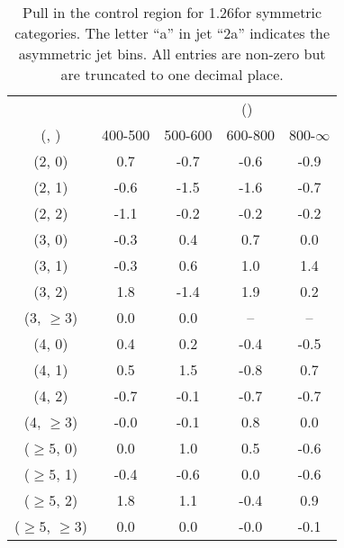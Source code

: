 \begin{table}[h!]
\tiny
\centering
\caption{Pull in the \gj control region for 1.26\ifb for symmetric categories. The letter ``a'' in jet \eg ``2a''  indicates the asymmetric jet bins. All entries are non-zero but are truncated to one decimal place.\label{tab:pullsep_ewk_gj_sym}}
\begin{tabular}
{ccccc}
	\hline\hline
&	& \multicolumn{4}{c}{\scalht (\gev)} \\ 
	 (\njet,  \nb) & 400-500 & 500-600 & 600-800 & 800-$\infty$ \\ [0.8ex] 
\hline
	(2, 0) & 0.7 & -0.7 & -0.6 & -0.9 \\[0.5ex] 
	(2, 1) & -0.6 & -1.5 & -1.6 & -0.7 \\[0.5ex] 
	(2, 2) & -1.1 & -0.2 & -0.2 & -0.2 \\[0.5ex] 
	(3, 0) & -0.3 & 0.4 & 0.7 & 0.0 \\[0.5ex] 
	(3, 1) & -0.3 & 0.6 & 1.0 & 1.4 \\[0.5ex] 
	(3, 2) & 1.8 & -1.4 & 1.9 & 0.2 \\[0.5ex] 
	(3, $\ge3$) & 0.0 & 0.0 & -- & -- \\[0.5ex] 
	(4, 0) & 0.4 & 0.2 & -0.4 & -0.5 \\[0.5ex] 
	(4, 1) & 0.5 & 1.5 & -0.8 & 0.7 \\[0.5ex] 
	(4, 2) & -0.7 & -0.1 & -0.7 & -0.7 \\[0.5ex] 
	(4, $\ge3$) & -0.0 & -0.1 & 0.8 & 0.0 \\[0.5ex] 
	($\ge5$, 0) & 0.0 & 1.0 & 0.5 & -0.6 \\[0.5ex] 
	($\ge5$, 1) & -0.4 & -0.6 & 0.0 & -0.6 \\[0.5ex] 
	($\ge5$, 2) & 1.8 & 1.1 & -0.4 & 0.9 \\[0.5ex] 
	($\ge5$, $\ge3$) & 0.0 & 0.0 & -0.0 & -0.1 \\[0.5ex] 
	\hline
	\hline
\end{tabular}
\end{table}
